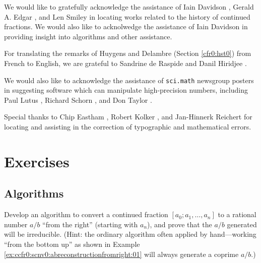 We would like to gratefully acknowledge the assistance of
   Iain Davidson   \cite{bibref:i:iaindavidson},
 Gerald A. Edgar \cite{bibref:i:geraldaedgar}, and
      Len Smiley      \cite{bibref:i:lensmiley}
in locating works related to the history of continued fractions.
We would also like to acknolwedge the assistance of 
   Iain Davidson   \cite{bibref:i:iaindavidson}
in providing insight into algorithms and other assistance.

For translating the remarks of Huygens and Delambre (Section 
\ref{cfr0:hst0}) from French
to English, we are grateful to Sandrine de Raspide \cite{bibref:i:sandrinederaspide}
and Danil Hiridjee \cite{bibref:i:danilhiridjee}.

We would also like to acknowledge the assistance of \texttt{sci.math}
\cite{bibref:n:scimathnewsgroup}
newsgroup posters in suggesting software which can manipulate
high-precision numbers, including
      Paul Lutus      \cite{bibref:i:paullutus},
  Richard Schorn  \cite{bibref:i:richardschorn},
and
      Don Taylor      \cite{bibref:i:dontaylor}.

Special thanks to
         Chip Eastham         \cite{bibref:i:chipeastham},
        Robert Kolker        \cite{bibref:i:robertkolker},
and
 Jan-Hinnerk Reichert \cite{bibref:i:janhinnerkreichert}
for locating and assisting in the correction of typographic
and mathematical errors.

\section{Exercises}

\subsection{Algorithms}

\begin{vworkexercisestatement}
\label{exe:cfr0:sexe0:a01}
Develop an algorithm to convert a continued fraction $[a_0;a_1, \ldots{}, a_n]$
to a rational number $a/b$ ``from the right'' (starting with $a_n$), and prove 
that the $a/b$ generated will be irreducible.  (Hint:  the ordinary algorithm
often applied by hand---working ``from the bottom up'' as shown in 
Example \ref{ex:ccfr0:scnv0:abreconstructionfromright:01}
will always generate a coprime $a/b$.)
\end{vworkexercisestatement}

